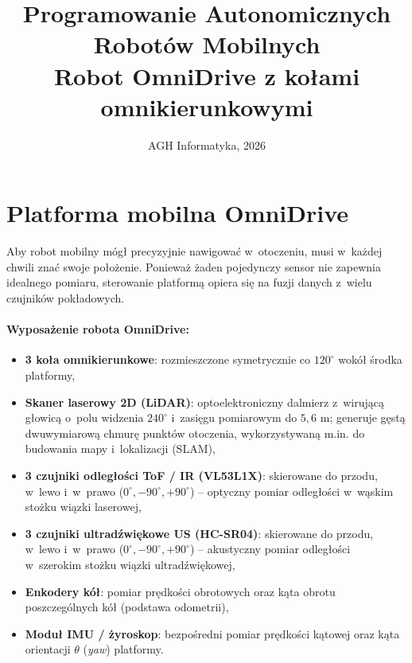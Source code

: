 \documentclass[10pt,a4paper]{article}
\title{\vspace{-0.9cm}\textbf{\Large Programowanie Autonomicznych Robotów Mobilnych}\\[0.25em]
\large \textbf{Robot OmniDrive z kołami omnikierunkowymi}}
\author{}
\date{\vspace{-0.5cm}\small AGH Informatyka, 2026}
\begin{document}
\maketitle
\thispagestyle{empty}

\section{Platforma mobilna OmniDrive}

Aby robot mobilny mógł precyzyjnie nawigować w~otoczeniu, musi w~każdej chwili znać swoje położenie. Ponieważ żaden pojedynczy sensor nie zapewnia idealnego pomiaru, sterowanie platformą opiera się na fuzji danych z~wielu czujników pokładowych.

\vspace{0.15cm}
\paragraph{Wyposażenie robota OmniDrive:}
\begin{itemize}[itemsep=4.5pt, topsep=4pt, parsep=1pt]
    \item \textbf{3 koła omnikierunkowe}: rozmieszczone symetrycznie co $120^\circ$ wokół środka platformy,
    \item \textbf{Skaner laserowy 2D (LiDAR)}: optoelektroniczny dalmierz z~wirującą głowicą o~polu widzenia $240^\circ$ i~zasięgu pomiarowym do $5{,}6\text{ m}$; generuje gęstą dwuwymiarową chmurę punktów otoczenia, wykorzystywaną m.in. do budowania mapy i~lokalizacji (SLAM),
    \item \textbf{3 czujniki odległości ToF / IR (VL53L1X)}: skierowane do przodu, w~lewo i~w~prawo ($0^\circ, -90^\circ, +90^\circ$) -- optyczny pomiar odległości w~wąskim stożku wiązki laserowej,
    \item \textbf{3 czujniki ultradźwiękowe US (HC-SR04)}: skierowane do przodu, w~lewo i~w~prawo ($0^\circ, -90^\circ, +90^\circ$) -- akustyczny pomiar odległości w~szerokim stożku wiązki ultradźwiękowej,
    \item \textbf{Enkodery kół}: pomiar prędkości obrotowych oraz kąta obrotu poszczególnych kół (podstawa odometrii),
    \item \textbf{Moduł IMU / żyroskop}: bezpośredni pomiar prędkości kątowej oraz kąta orientacji $\theta$ (\emph{yaw}) platformy.
\end{itemize}
\end{document}
